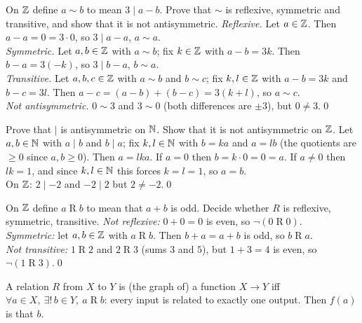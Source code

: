 \begin{hexample}\label{ex:mod3}
On $\mathbb{Z}$ define $a\sim b$ to mean $3\mid a-b$. Prove that $\sim$ is reflexive, symmetric and transitive, and show that it is not antisymmetric.
\solution
\emph{Reflexive.} Let $a\in\mathbb{Z}$. Then $a-a=0=3\cdot0$, so $3\mid a-a$, \ie $a\sim a$.\\
\emph{Symmetric.} Let $a,b\in\mathbb{Z}$ with $a\sim b$; fix $k\in\mathbb{Z}$ with $a-b=3k$. Then $b-a=3(-k)$, so $3\mid b-a$, \ie $b\sim a$.\\
\emph{Transitive.} Let $a,b,c\in\mathbb{Z}$ with $a\sim b$ and $b\sim c$; fix $k,l\in\mathbb{Z}$ with $a-b=3k$ and $b-c=3l$. Then $a-c=(a-b)+(b-c)=3(k+l)$, so $a\sim c$.\\
\emph{Not antisymmetric.} $0\sim3$ and $3\sim0$ (both differences are $\pm3$), but $0\neq3$.\qed
\end{hexample}

\begin{hexample}
Prove that $\mid$ is antisymmetric on $\mathbb{N}$. Show that it is not antisymmetric on $\mathbb{Z}$.
\solution
Let $a,b\in\mathbb{N}$ with $a\mid b$ and $b\mid a$; fix $k,l\in\mathbb{N}$ with $b=ka$ and $a=lb$ (the quotients are $\ge0$ since $a,b\ge0$). Then $a=lka$. If $a=0$ then $b=k\cdot0=0=a$. If $a\neq0$ then $lk=1$, and since $k,l\in\mathbb{N}$ this forces $k=l=1$, so $a=b$.\\
On $\mathbb{Z}$: $2\mid-2$ and $-2\mid2$ but $2\neq-2$.\qed
\end{hexample}

\begin{hexample}
On $\mathbb{Z}$ define $a\mathrel Rb$ to mean that $a+b$ is odd. Decide whether $R$ is reflexive, symmetric, transitive.
\solution
\emph{Not reflexive:} $0+0=0$ is even, so $\neg(0\mathrel R0)$.\\
\emph{Symmetric:} let $a,b\in\mathbb{Z}$ with $a\mathrel Rb$. Then $b+a=a+b$ is odd, so $b\mathrel Ra$.\\
\emph{Not transitive:} $1\mathrel R2$ and $2\mathrel R3$ (sums $3$ and $5$), but $1+3=4$ is even, so $\neg(1\mathrel R3)$.\qed
\end{hexample}

\begin{key}
A relation $R$ from $X$ to $Y$ is (the graph of) a function $X\to Y$ iff \ $\forall a\in X,\ \exists!\,b\in Y,\ a\mathrel Rb$: every input is related to exactly one output. Then $f(a)$ is that $b$.
\end{key}

